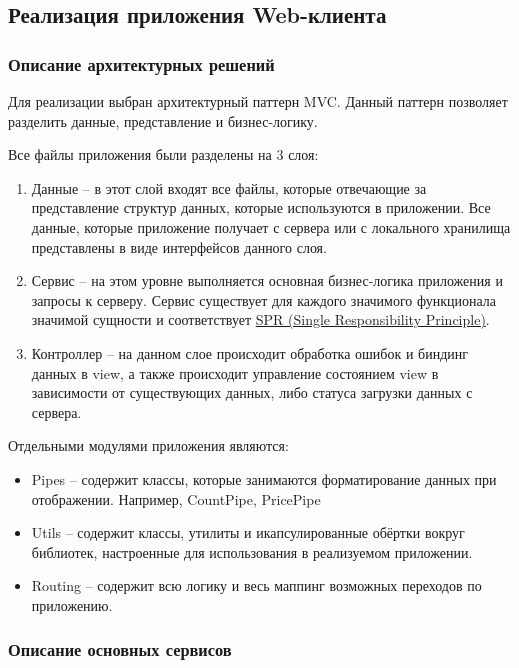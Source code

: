 \subsection{Реализация приложения Web-клиента}\label{subsec:3-impl-web}\indent

\subsubsection{Описание архитектурных решений}\indent

Для реализации выбран архитектурный паттерн MVC. Данный паттерн позволяет разделить данные, представление и бизнес-логику.

Все файлы приложения были разделены на 3 слоя:
\begin{enumerate}
    \item Данные – в этот слой входят все файлы, которые отвечающие за представление структур данных, которые используются в приложении.
    Все данные, которые приложение получает с сервера или с локального хранилища представлены в виде интерфейсов данного слоя.
    \item Сервис – на этом уровне выполняется основная бизнес-логика приложения и запросы к серверу.
    Сервис существует для каждого значимого функционала значимой сущности и соответствует \hyperlink{gloss:spr}{SPR (Single Responsibility Principle)}.
    \item Контроллер – на данном слое происходит обработка ошибок и биндинг данных в view, а также происходит управление состоянием view в зависимости от существующих данных, либо статуса загрузки данных с сервера.
\end{enumerate}

Отдельными модулями приложения являются:
\begin{itemize}
    \item Pipes – содержит классы, которые занимаются форматирование данных при отображении.
    Например, CountPipe, PricePipe
    \item Utils – содержит классы, утилиты и икапсулированные обёртки вокруг библиотек, настроенные для использования в реализуемом приложении.
    \item Routing – содержит всю логику и весь маппинг возможных переходов по приложению.
\end{itemize}

\subsubsection{Описание основных сервисов}\indent

